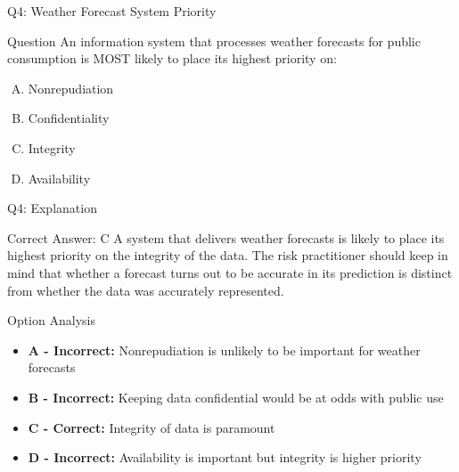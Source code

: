 \documentclass{beamer}
\begin{document}
	\begin{frame}{Q4: Weather Forecast System Priority}
		\begin{block}{Question}
			An information system that processes weather forecasts for public consumption is MOST likely to place its highest priority on:
		\end{block}
		\begin{enumerate}[(A)]
			\item Nonrepudiation
			\item Confidentiality
			\item Integrity
			\item Availability
		\end{enumerate}
	\end{frame}
	
	\begin{frame}{Q4: Explanation}
		\begin{block}{Correct Answer: C}
			A system that delivers weather forecasts is likely to place its highest priority on the integrity of the data. The risk practitioner should keep in mind that whether a forecast turns out to be accurate in its prediction is distinct from whether the data was accurately represented.
		\end{block}
		\begin{block}{Option Analysis}
			\begin{itemize}
				\item \textbf{A - Incorrect:} Nonrepudiation is unlikely to be important for weather forecasts
				\item \textbf{B - Incorrect:} Keeping data confidential would be at odds with public use
				\item \textbf{C - Correct:} Integrity of data is paramount
				\item \textbf{D - Incorrect:} Availability is important but integrity is higher priority
			\end{itemize}
		\end{block}
	\end{frame}
	
\end{document}
